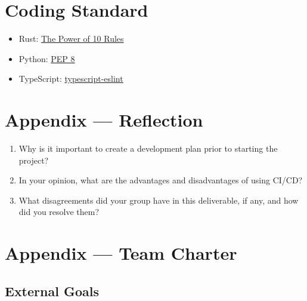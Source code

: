 \documentclass{article}
\begin{document}
\section{Coding Standard}

\begin{itemize}
  \item Rust:
        \href{https://en.wikipedia.org/wiki/The_Power_of_10:_Rules_for_Developing_Safety-Critical_Code}{The
          Power of 10 Rules}
  \item Python: \href{https://peps.python.org/pep-0008/}{PEP 8}
  \item TypeScript:
        \href{https://typescript-eslint.io/packages/typescript-eslint}{typescript-eslint}

\end{itemize}


\newpage{}

\section*{Appendix --- Reflection}




\begin{enumerate}
  \item Why is it important to create a development plan prior to starting the project?
  \item In your opinion, what are the advantages and disadvantages of using CI/CD?
  \item What disagreements did your group have in this deliverable, if any, and how did
        you resolve them?
\end{enumerate}

\newpage{}

\section*{Appendix --- Team Charter}


\subsection*{External Goals}
\end{document}
